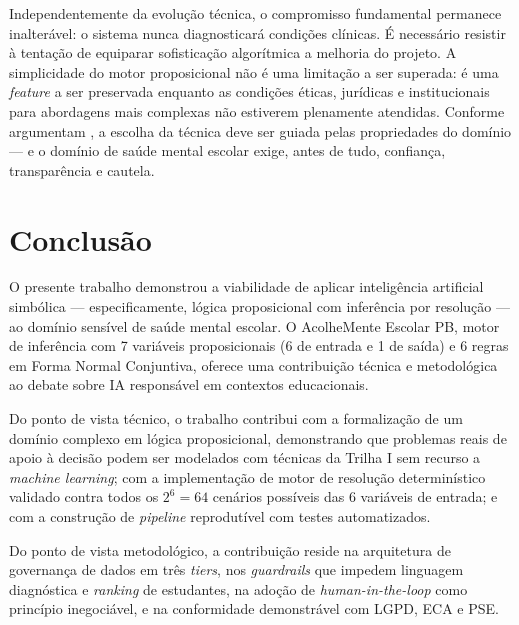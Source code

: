 \documentclass[
    12pt,
    openright,
    oneside,
    a4paper,
    english,
    brazil
]{abntex2}
\begin{document}
Independentemente da evolu\c{c}\~ao t\'ecnica, o compromisso fundamental permanece inalter\'avel: o sistema nunca diagnosticar\'a condi\c{c}\~oes cl\'inicas. \'E necess\'ario resistir \`a tenta\c{c}\~ao de equiparar sofistica\c{c}\~ao algor\'itmica a melhoria do projeto. A simplicidade do motor proposicional n\~ao \'e uma limita\c{c}\~ao a ser superada: \'e uma \textit{feature} a ser preservada enquanto as condi\c{c}\~oes \'eticas, jur\'idicas e institucionais para abordagens mais complexas n\~ao estiverem plenamente atendidas. Conforme argumentam , a escolha da t\'ecnica deve ser guiada pelas propriedades do dom\'inio --- e o dom\'inio de sa\'ude mental escolar exige, antes de tudo, confian\c{c}a, transpar\^encia e cautela.

\chapter{Conclus\~ao}

O presente trabalho demonstrou a viabilidade de aplicar intelig\^encia artificial simb\'olica --- especificamente, l\'ogica proposicional com infer\^encia por resolu\c{c}\~ao --- ao dom\'inio sens\'ivel de sa\'ude mental escolar. O AcolheMente Escolar PB, motor de infer\^encia com 7 vari\'aveis proposicionais (6 de entrada e 1 de sa\'ida) e 6 regras em Forma Normal Conjuntiva, oferece uma contribui\c{c}\~ao t\'ecnica e metodol\'ogica ao debate sobre IA respons\'avel em contextos educacionais.

Do ponto de vista t\'ecnico, o trabalho contribui com a formaliza\c{c}\~ao de um dom\'inio complexo em l\'ogica proposicional, demonstrando que problemas reais de apoio \`a decis\~ao podem ser modelados com t\'ecnicas da Trilha I sem recurso a \textit{machine learning}; com a implementa\c{c}\~ao de motor de resolu\c{c}\~ao determin\'istico validado contra todos os $2^6 = 64$ cen\'arios poss\'iveis das 6 vari\'aveis de entrada; e com a constru\c{c}\~ao de \textit{pipeline} reprodut\'ivel com testes automatizados.

Do ponto de vista metodol\'ogico, a contribui\c{c}\~ao reside na arquitetura de governan\c{c}a de dados em tr\^es \textit{tiers}, nos \textit{guardrails} que impedem linguagem diagn\'ostica e \textit{ranking} de estudantes, na ado\c{c}\~ao de \textit{human-in-the-loop} como princ\'ipio inegoci\'avel, e na conformidade demonstr\'avel com LGPD, ECA e PSE.
\end{document}
